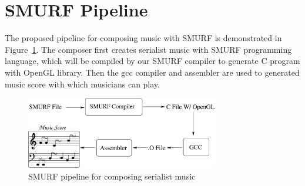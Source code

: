 \section{SMURF Pipeline}

The proposed pipeline for composing music with SMURF is demonstrated in Figure~\ref{fig:pipeline}. 
The composer first creates serialist music with SMURF programming language, which will be 
compiled by our SMURF compiler to generate C program with OpenGL library. Then the gcc compiler 
and assembler are used to generated music score with which musicians can play. 


\begin{figure}
	\centering
	\includegraphics[width=0.75\textwidth]{figures/pipeline}
	\caption{SMURF pipeline for composing serialist music}
	\label{fig:pipeline}
\end{figure}
